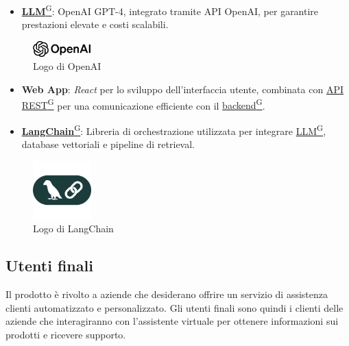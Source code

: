 \begin{itemize}
    \item \href{https://code7crusaders.github.io/docs/RTB/documentazione_interna/glossario.html#llm-large-language-model}{\textbf{LLM}\textsuperscript{G}}: OpenAI GPT-4, integrato tramite API OpenAI, per garantire prestazioni elevate e costi scalabili.

\end{itemize}
\begin{figure}[H]

    \centering
    \includegraphics[width=0.2\textwidth]{img/openai-lockup.png}
    \caption{Logo di OpenAI}
    \label{fig:openai_logo}

\end{figure}

\begin{itemize}
    \item \textbf{Web App}: \textit{React} per lo sviluppo dell’interfaccia utente, combinata con \href{https://code7crusaders.github.io/docs/RTB/documentazione_interna/glossario.html#api-rest-representational-state-transfer}{API REST\textsuperscript{G}} per una comunicazione efficiente con il \href{https://code7crusaders.github.io/docs/RTB/documentazione_interna/glossario.html#backend}{backend\textsuperscript{G}}.
    \item \href{https://code7crusaders.github.io/docs/RTB/documentazione_interna/glossario.html#langchain}{\textbf{LangChain}\textsuperscript{G}}: Libreria di orchestrazione utilizzata per integrare \href{https://code7crusaders.github.io/docs/RTB/documentazione_interna/glossario.html#llm-large-language-model}{LLM\textsuperscript{G}}, database vettoriali e pipeline di retrieval.
\end{itemize}

\begin{figure}[H]
    \centering
    \includegraphics[width=0.2\textwidth]{img/lang-chain.png}
    \caption{Logo di LangChain}
    \label{fig:langchain_logo}
\end{figure}


\subsection{Utenti finali}
Il prodotto è rivolto a aziende che desiderano offrire un servizio di assistenza 
clienti automatizzato e personalizzato. Gli utenti finali sono quindi i clienti 
delle aziende che interagiranno con l’assistente virtuale per ottenere 
informazioni sui prodotti e ricevere supporto.